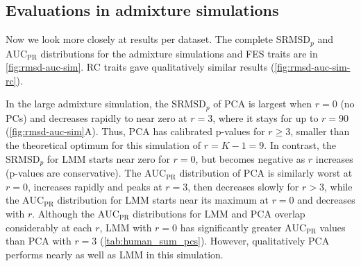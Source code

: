 \documentclass[11pt]{article}
\newcommand{\rmsd}{\text{SRMSD}_p}
\newcommand{\auc}{\text{AUC}_\text{PR}}
\begin{document}
\subsection{Evaluations in admixture simulations}

Now we look more closely at results per dataset.
The complete $\rmsd$ and $\auc$ distributions for the admixture simulations and FES traits are in \cref{fig:rmsd-auc-sim}.
RC traits gave qualitatively similar results (\cref{fig:rmsd-auc-sim-rc}).

In the large admixture simulation, the $\rmsd$ of PCA is largest when $r=0$ (no PCs) and decreases rapidly to near zero at $r=3$, where it stays for up to $r=90$ (\cref{fig:rmsd-auc-sim}A).
Thus, PCA has calibrated p-values for $r \ge 3$, smaller than the theoretical optimum for this simulation of $r = K - 1 = 9$.
In contrast, the $\rmsd$ for LMM starts near zero for $r=0$, but becomes negative as $r$ increases (p-values are conservative).
The $\auc$ distribution of PCA is similarly worst at $r=0$, increases rapidly and peaks at $r = 3$, then decreases slowly for $r > 3$, while the $\auc$ distribution for LMM starts near its maximum at $r=0$ and decreases with $r$.
Although the $\auc$ distributions for LMM and PCA overlap considerably at each $r$, LMM with $r=0$ has significantly greater $\auc$ values than PCA with $r=3$ (\cref{tab:human_sum_pcs}).
However, qualitatively PCA performs nearly as well as LMM in this simulation.
\end{document}
